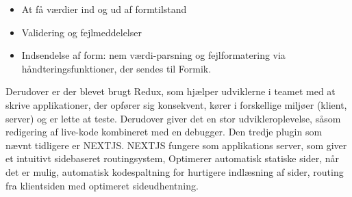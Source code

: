 \begin{itemize}
    \item At få værdier ind og ud af formtilstand
    \item  Validering og fejlmeddelelser
    \item  Indsendelse af form: nem værdi-parsning og fejlformatering via håndteringsfunktioner, der sendes til Formik.
\end{itemize}

Derudover er der blevet brugt Redux, som hjælper udviklerne i teamet med at skrive applikationer, der opfører sig konsekvent, kører i forskellige miljøer (klient, server) og er lette at teste. Derudover giver det en stor udvikleroplevelse, såsom redigering af live-kode kombineret med en debugger. 
Den tredje plugin som nævnt tidligere er NEXTJS. NEXTJS fungere som applikations server, som giver et intuitivt sidebaseret routingsystem, Optimerer automatisk statiske sider, når det er mulig, automatisk kodespaltning for hurtigere indlæsning af sider, routing fra klientsiden med optimeret sideudhentning.


 



